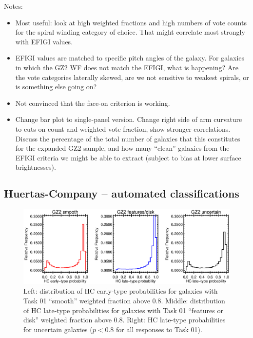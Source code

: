 \documentclass[useAMS,usenatbib]{mn2e}
\begin{document}
Notes:
\begin{itemize}
\item Most useful: look at high weighted fractions and high numbers of vote counts for the spiral winding category of choice. That might correlate most strongly with EFIGI values. 

\item EFIGI values are matched to specific pitch angles of the galaxy. For galaxies in which the GZ2 WF does not match the EFIGI, what is happening? Are the vote categories laterally skewed, are we not sensitive to weakest spirals, or is something else going on?

\item Not convinced that the face-on criterion is working. 

\item Change bar plot to single-panel version. Change right side of arm curvature to cuts on count and weighted vote fraction, show stronger correlations. Discuss the percentage of the total number of galaxies that this constitutes for the expanded GZ2 sample, and how many ``clean'' galaxies from the EFIGI criteria we might be able to extract (subject to bias at lower surface brightnesses).
\end{itemize}

\subsection{Huertas-Company -- automated classifications}

\begin{figure}
\includegraphics[angle=0,width=7.0in]{figures/hc_histogram.eps}
\caption{Left: distribution of HC early-type probabilities for galaxies with Task 01 ``smooth'' weighted fraction above 0.8. Middle: distribution of HC late-type probabilities for galaxies with Task 01 ``features or disk'' weighted fraction above 0.8. Right: HC late-type probabilities for uncertain galaxies ($p<0.8$ for all responses to Task 01). 
\label{fig-hc_histogram}}
\end{figure}
\end{document}
